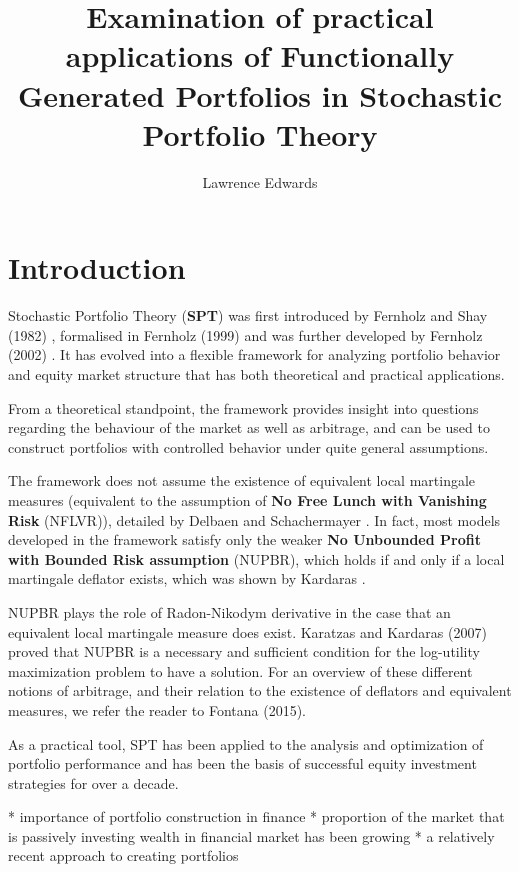 \documentclass[british]{amsart}
\numberwithin{equation}{section}
\numberwithin{figure}{section}
\theoremstyle{plain}
\theoremstyle{definition}
\theoremstyle{plain}
\theoremstyle{plain}
\theoremstyle{plain}
\begin{document}
\title{Examination of practical applications of Functionally Generated 
Portfolios in Stochastic Portfolio Theory}
\author{Lawrence Edwards}
\maketitle

\tableofcontents{}

\section{Introduction}
Stochastic Portfolio Theory (\textbf{SPT}) was first introduced by Fernholz and 
Shay (1982) \cite{fernholz1982}, formalised in Fernholz (1999) 
\cite{fernholz1999} and was further developed by Fernholz (2002) 
\cite{fernholz2002}. It has evolved into a flexible framework for analyzing 
portfolio behavior and equity market structure that has both theoretical and 
practical applications.

From a theoretical standpoint, the framework provides insight into questions 
regarding the behaviour of the market as well as arbitrage, and can be used to 
construct portfolios with controlled behavior under quite general assumptions. 

The framework does not assume the existence of equivalent local martingale
measures (equivalent to the assumption of \textbf{No Free Lunch with Vanishing 
Risk} (NFLVR)), detailed by Delbaen and Schachermayer \cite{delbaen1994}. In 
fact, most models developed in the framework satisfy only the weaker \textbf{No 
Unbounded Profit with Bounded Risk assumption} (NUPBR), which holds if and only 
if a local martingale deflator exists, which was shown by Kardaras 
\cite{kardaras2012}. 

NUPBR plays the role of Radon-Nikodym derivative in the case that an equivalent
local martingale measure does exist.  Karatzas and Kardaras (2007) proved that 
NUPBR is a necessary and sufficient condition for the log-utility maximization 
problem to have a solution. For an overview of these different notions of 
arbitrage, and their relation to the existence of deflators and equivalent 
measures, we refer the reader to Fontana (2015).

As a practical tool, SPT has been applied to the analysis and optimization of 
portfolio performance and has been the basis of successful equity investment 
strategies for over a decade.

* importance of portfolio construction in finance
* proportion of the market that is passively investing wealth in financial 
market has been growing
* a relatively recent approach to creating portfolios
\end{document}
